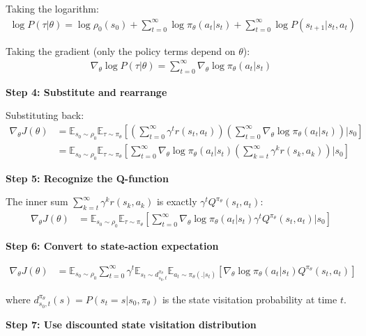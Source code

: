 Taking the logarithm:
\begin{align}
\log P(\tau|\theta) = \log \rho_0(s_0) + \sum_{t=0}^{\infty} \log \pi_\theta(a_t|s_t) + \sum_{t=0}^{\infty} \log P(s_{t+1}|s_t, a_t)
\end{align}

Taking the gradient (only the policy terms depend on $\theta$):
\begin{align}
\nabla_\theta \log P(\tau|\theta) = \sum_{t=0}^{\infty} \nabla_\theta \log \pi_\theta(a_t|s_t)
\end{align}

\textbf{Step 4: Substitute and rearrange}

Substituting back:
\begin{align}
\nabla_\theta J(\theta) &= \mathbb{E}_{s_0 \sim \rho_0} \mathbb{E}_{\tau \sim \pi_\theta} \left[ \left( \sum_{t=0}^{\infty} \gamma^t r(s_t, a_t) \right) \left( \sum_{t=0}^{\infty} \nabla_\theta \log \pi_\theta(a_t|s_t) \right) \Big| s_0 \right] \\
&= \mathbb{E}_{s_0 \sim \rho_0} \mathbb{E}_{\tau \sim \pi_\theta} \left[ \sum_{t=0}^{\infty} \nabla_\theta \log \pi_\theta(a_t|s_t) \left( \sum_{k=t}^{\infty} \gamma^k r(s_k, a_k) \right) \Big| s_0 \right]
\end{align}

\textbf{Step 5: Recognize the Q-function}

The inner sum $\sum_{k=t}^{\infty} \gamma^k r(s_k, a_k)$ is exactly $\gamma^t Q^{\pi_\theta}(s_t, a_t)$:
\begin{align}
\nabla_\theta J(\theta) &= \mathbb{E}_{s_0 \sim \rho_0} \mathbb{E}_{\tau \sim \pi_\theta} \left[ \sum_{t=0}^{\infty} \nabla_\theta \log \pi_\theta(a_t|s_t) \gamma^t Q^{\pi_\theta}(s_t, a_t) \Big| s_0 \right]
\end{align}

\textbf{Step 6: Convert to state-action expectation}

\begin{align}
\nabla_\theta J(\theta) &= \mathbb{E}_{s_0 \sim \rho_0} \sum_{t=0}^{\infty} \gamma^t \mathbb{E}_{s_t \sim d^{\pi_\theta}_{s_0,t}} \mathbb{E}_{a_t \sim \pi_\theta(.|s_t)} \left[ \nabla_\theta \log \pi_\theta(a_t|s_t) Q^{\pi_\theta}(s_t, a_t) \right]
\end{align}

where $d^{\pi_\theta}_{s_0,t}(s) = P(s_t = s | s_0, \pi_\theta)$ is the state visitation probability at time $t$.

\textbf{Step 7: Use discounted state visitation distribution}

